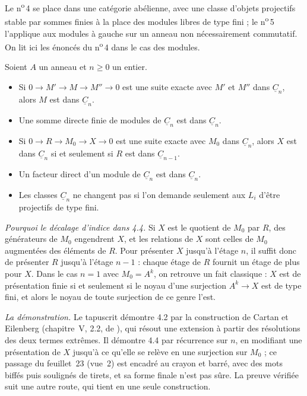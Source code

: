 Le n\textsuperscript{o}\,4 se place dans une catégorie abélienne, avec une classe d'objets projectifs stable par sommes finies à la place des modules libres de type fini ; le n\textsuperscript{o}\,5 l'applique aux modules à gauche sur un anneau non nécessairement commutatif. On lit ici les énoncés du n\textsuperscript{o}\,4 dans le cas des modules.

\begin{encadre}
\begin{enonce}
Soient $A$ un anneau et $n \geq 0$ un entier.
\begin{itemize}
\item[(4.2)] Si $0 \to M' \to M \to M'' \to 0$ est une suite exacte avec $M'$ et $M''$ dans $\underline C_n$, alors $M$ est dans $\underline C_n$.
\item[(4.3)] Une somme directe finie de modules de $\underline C_n$ est dans $\underline C_n$.
\item[(4.4)] Si $0 \to R \to M_0 \to X \to 0$ est une suite exacte avec $M_0$ dans $\underline C_n$, alors $X$ est dans $\underline C_n$ si et seulement si $R$ est dans $\underline C_{n-1}$.
\item[(4.7~bis)] Un facteur direct d'un module de $\underline C_n$ est dans $\underline C_n$.
\item[(n\textsuperscript{o}\,5)] Les classes $\underline C_n$ ne changent pas si l'on demande seulement aux $L_i$ d'être projectifs de type fini.
\end{itemize}
\end{enonce}
\end{encadre}

\emph{Pourquoi le décalage d'indice dans 4.4.} Si $X$ est le quotient de $M_0$ par $R$, des générateurs de $M_0$ engendrent $X$, et les relations de $X$ sont celles de $M_0$ augmentées des éléments de $R$. Pour présenter $X$ jusqu'à l'étage $n$, il suffit donc de présenter $R$ jusqu'à l'étage $n - 1$ : chaque étage de $R$ fournit un étage de plus pour $X$. Dans le cas $n = 1$ avec $M_0 = A^k$, on retrouve un fait classique : $X$ est de présentation finie si et seulement si le noyau d'une surjection $A^k \to X$ est de type fini, et alors le noyau de toute surjection de ce genre l'est.

\emph{La démonstration.} Le tapuscrit démontre 4.2 par la construction  de Cartan et Eilenberg (chapitre~V, 2.2, de \cite{cartaneilenberg1956}), qui résout une extension à partir des résolutions des deux termes extrêmes. Il démontre 4.4 par récurrence sur $n$, en modifiant une présentation de $X$ jusqu'à ce qu'elle se relève en une surjection sur $M_0$ ; ce passage du feuillet~23 (vue~2) est encadré au crayon et barré, avec des mots biffés puis soulignés de tirets, et sa forme finale n'est pas sûre. La preuve vérifiée suit une autre route, qui tient en une seule construction.

